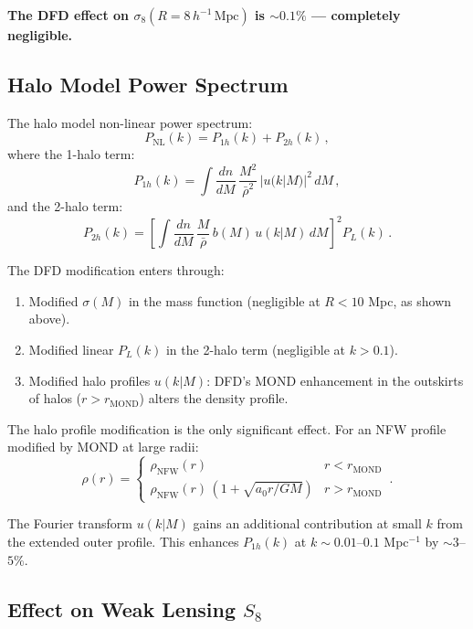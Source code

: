 \documentclass[11pt,a4paper]{article}
\begin{document}
\textbf{The DFD effect on $\sigma_8(R = 8\,h^{-1}\,\mathrm{Mpc})$ is $\sim 0.1\%$ --- completely negligible.}

\subsection{Halo Model Power Spectrum}

The halo model non-linear power spectrum:
\begin{equation}
P_{\mathrm{NL}}(k) = P_{1h}(k) + P_{2h}(k)\,,
\end{equation}
where the 1-halo term:
\begin{equation}
P_{1h}(k) = \int \frac{dn}{dM}\,\frac{M^2}{\bar{\rho}^2}\,|u(k|M)|^2\,dM\,,
\end{equation}
and the 2-halo term:
\begin{equation}
P_{2h}(k) = \left[\int \frac{dn}{dM}\,\frac{M}{\bar{\rho}}\,b(M)\,u(k|M)\,dM\right]^2 P_L(k)\,.
\end{equation}

The DFD modification enters through:
\begin{enumerate}
\item Modified $\sigma(M)$ in the mass function (negligible at $R < 10$ Mpc, as shown above).
\item Modified linear $P_L(k)$ in the 2-halo term (negligible at $k > 0.1$).
\item Modified halo profiles $u(k|M)$: DFD's MOND enhancement in the outskirts of halos ($r > r_{\mathrm{MOND}}$) alters the density profile.
\end{enumerate}

The halo profile modification is the only significant effect. For an NFW profile modified by MOND at large radii:
\begin{equation}
\rho(r) = \begin{cases} \rho_{\mathrm{NFW}}(r) & r < r_{\mathrm{MOND}} \\ \rho_{\mathrm{NFW}}(r)\,(1 + \sqrt{a_0 r/GM}) & r > r_{\mathrm{MOND}} \end{cases}\,.
\end{equation}

The Fourier transform $u(k|M)$ gains an additional contribution at small $k$ from the extended outer profile. This enhances $P_{1h}(k)$ at $k \sim 0.01$--$0.1$ Mpc$^{-1}$ by $\sim 3$--$5\%$.

\subsection{Effect on Weak Lensing $S_8$}
\end{document}
